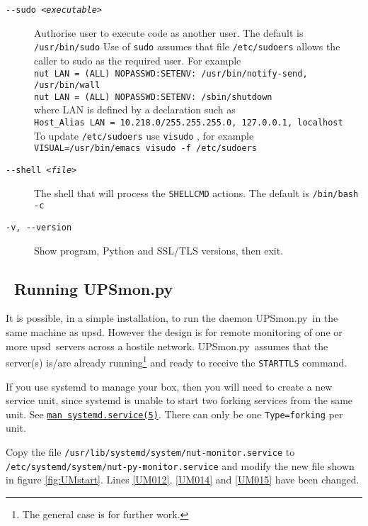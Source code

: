 \documentclass[12pt]{article}
\newlength{\headersep}\setlength{\headersep}{3mm}
\newcommand{\Hsep}{\hspace{\headersep}}
\newcommand{\newcolumn}{\vfill\eject}
\newcommand{\upsd}{\mbox{\textcolor{UPSDCOLOUR}{upsd}}}
\newcommand{\UPSmon}{\mbox{\textcolor{UPSMONCOLOUR}{UPSmon.py}}}
\newcommand{\LINman}[2]{\href{https://man7.org/linux/man-pages/man#2/#1.#2.html}{\texttt{man #1(#2)}}}
\begin{document}
\begin{description}
\item[\texttt{-\/-sudo \textit{<executable>}}] Authorise user to execute code
  as another user.  The default is \texttt{/usr/bin/{\allowbreak}sudo} Use of
  \texttt{sudo} assumes that file \texttt{/etc/sudoers} allows the caller to
  sudo as the required user.  For example \\ 
  \texttt{nut LAN = (ALL) NOPASSWD:SETENV: /usr/bin/notify-send, /usr/bin/wall} \\
  \texttt{nut LAN = (ALL) NOPASSWD:SETENV: /sbin/{\allowbreak}shutdown} \\
  where LAN is defined by a declaration such as \\
  \texttt{Host\_Alias LAN = 10.218.0/255.255.255.0, 127.0.0.1, localhost} \\
 To update \texttt{/etc/sudoers} use \texttt{visudo} , for example
 \texttt{VISUAL=/usr/{\allowbreak}bin/{\allowbreak}emacs visudo -f
   /etc/{\allowbreak}sudoers}

\item[\texttt{-\/-shell \textit{<file>}}] The shell that will process the
  \texttt{SHELLCMD} actions. The default is \texttt{/bin/bash -c}

\item[\texttt{-v, -\/-version}] Show program, Python and SSL/TLS versions,
  then exit.

\end{description}

\newcolumn
\subsection{\Hsep\ Running \UPSmon}\label{section:UMrun}

It is possible, in a simple installation, to run the daemon \UPSmon\ in the
same machine as \upsd.  However the design is for remote monitoring of one or
more \upsd\ servers across a hostile network.  \UPSmon\ assumes that the
server(s) is/are already running\footnote{The general case is for further
  work.} and ready to receive the \texttt{STARTTLS} command.

If you use systemd to manage your box, then you will need to create a new
service unit, since systemd is unable to start two forking services from the
same unit.  See \LINman{systemd.service}{5}.  There can only be one
\texttt{Type=forking} per unit.

Copy the file
\texttt{/usr/lib/{\allowbreak}systemd/{\allowbreak}system/{\allowbreak}nut-monitor.{\allowbreak}service}
to
\texttt{/etc/systemd/{\allowbreak}system/{\allowbreak}nut-py-monitor.{\allowbreak}service}
and modify the new file shown in figure \ref{fig:UMstart}.  Lines \ref{UM012},
\ref{UM014} and \ref{UM015} have been changed.
\end{document}
